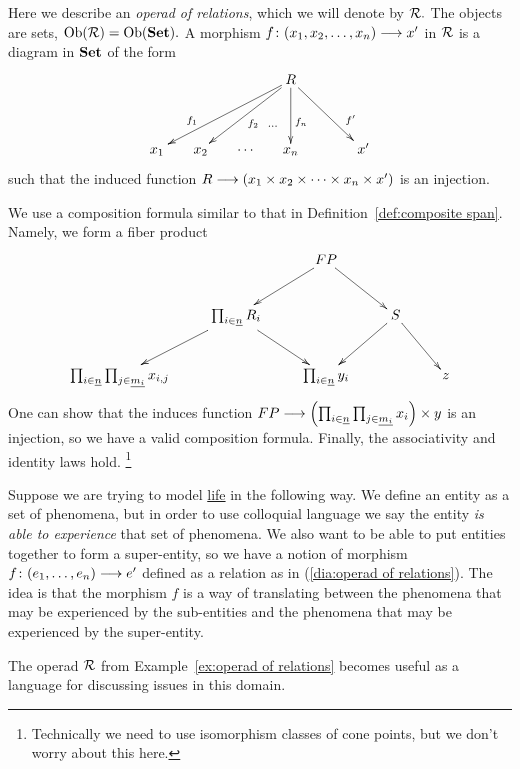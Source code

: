 \documentclass[CT4S-EN-RU]{subfiles}
\begin{document}
\begin{exampleENG}\label{ex:operad of relations}
Here we describe an {\em operad of relations}, which we will denote by $\mathcal{R}.$ The objects are sets, $\textnormal{Ob}(\mathcal{R})=\textnormal{Ob}({\mathbf{Set}}).$ A morphism $f\colon (x_1,x_2,\ldots,x_n)\longrightarrow x'$ in $\mathcal{R}$ is a diagram in ${\mathbf{Set}}$ of the form 
\begin{align}\label{dia:operad of relations}
\xymatrix@=15pt{&&&R\ar[llldd]_(.7){f_1}\ar[lldd]^{f_2}\ar@{}[ldd]^(.6)\cdots\ar[dd]^(.6){f_n}\ar[rrdd]^(.7){f'}\\\\x_1&x_2&\cdots&x_n&&x'}
\end{align} 
such that the induced function $R\longrightarrow(x_1\times x_2\times\cdots\times x_n\times x')$ is an injection.

We use a composition formula similar to that in Definition~\ref{def:composite span}. Namely, we form a fiber product
$$\xymatrix{&&FP\ar[rd]\ar[ld]\\&\prod_{i\in\ul{n}}R_i\ar[ld]\ar[rd]&&S\ar[ld]\ar[rd]\\\prod_{i\in\ul{n}}\prod_{j\in\ul{m_i}}x_{i,j}&&\prod_{i\in\ul{n}}y_i&&z}$$
One can show that the induces function $FP\longrightarrow\left(\prod_{i\in\underline{n}}\prod_{j\in\underline{m_i}}x_i\right)\times y$ is an injection, so we have a valid composition formula. Finally, the associativity and identity laws hold.
\footnote{Technically we need to use isomorphism classes of cone points, but we don't worry about this here.}
\end{exampleENG}

\begin{exampleRUS}\label{ex:operad of relations}
\end{exampleRUS}

\begin{applicationENG}\label{app:entity by experience}
Suppose we are trying to model \href{http://en.wikipedia.org/wiki/Life}{\text life} in the following way. We define an entity as a set of phenomena, but in order to use colloquial language we say the entity {\em is able to experience} that set of phenomena. We also want to be able to put entities together to form a super-entity, so we have a notion of morphism $f\colon(e_1,\ldots,e_n)\longrightarrow e'$ defined as a relation as in (\ref{dia:operad of relations}). The idea is that the morphism $f$ is a way of translating between the phenomena that may be experienced by the sub-entities and the phenomena that may be experienced by the super-entity. 

The operad $\mathcal{R}$ from Example~\ref{ex:operad of relations} becomes useful as a language for discussing issues in this domain.
\end{applicationENG}
\end{document}
